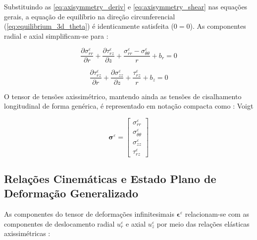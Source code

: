 Substituindo as \eqref{eq:axisymmetry_deriv} e \eqref{eq:axisymmetry_shear} nas equações gerais, a equação de equilíbrio na direção circunferencial (\eqref{eq:equilibrium_3d_theta}) é identicamente satisfeita ($0 = 0$). As componentes radial e axial simplificam-se para \cite{Timoshenko_1951}:


\begin{equation}
  \frac{\partial \sigma_{rr}^\varepsilon}{\partial r} + \frac{\partial \tau_{rz}^\varepsilon}{\partial z} + \frac{\sigma_{rr}^\varepsilon - \sigma_{\theta\theta}^\varepsilon}{r} + b_r = 0
  \label{eq:equilibrium_axi_r}
\end{equation}

\begin{equation}
  \frac{\partial \tau_{rz}^\varepsilon}{\partial r} + \frac{\partial \sigma_{zz}^\varepsilon}{\partial z} + \frac{\tau_{rz}^\varepsilon}{r} + b_z = 0
  \label{eq:equilibrium_axi_z}
\end{equation}

O tensor de tensões axissimétrico, mantendo ainda as tensões de cisalhamento longitudinal de forma genérica, é representado em notação compacta como \cite{Sadd2009}:
Voigt

\begin{equation}
  \boldsymbol{\sigma}^\varepsilon = \begin{bmatrix}
    \sigma_{rr}^\varepsilon \\
    \sigma_{\theta\theta}^\varepsilon \\
    \sigma_{zz}^\varepsilon \\
    \tau_{rz}^\varepsilon
  \end{bmatrix}
  \label{eq:voigt_stress_axi}
\end{equation}


\subsection{Relações Cinemáticas e Estado Plano de Deformação Generalizado}

As componentes do tensor de deformações infinitesimais $\mathbf{\epsilon}^\varepsilon$ relacionam-se com as componentes de deslocamento radial $u_r^\varepsilon$ e axial $u_z^\varepsilon$ por meio das relações elásticas axissimétricas \cite{Timoshenko_1951}:

